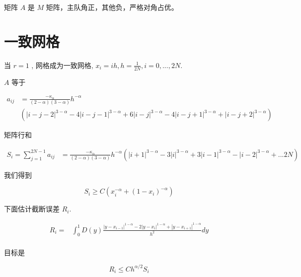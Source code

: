\documentclass{ctexart}
\theoremstyle{definition}
\theoremstyle{remark}
\numberwithin{equation}{section}
\begin{document}
矩阵 \(A\) 是 \(M\) 矩阵，主队角正，其他负，严格对角占优。


\section{一致网格}

当 \(r=1\) , 网格成为一致网格, \(x_i = ih, h=\frac{1}{2N}, i=0, ..., 2N\).

\(A\) 等于

\begin{equation}
    \begin{aligned}
        a_{ij} & = \frac{-\kappa_\alpha}{(2-\alpha)(3-\alpha)} h^{-\alpha}                                                                             \\
               & \left( |i-j-2|^{3-\alpha} - 4 |i-j-1|^{3-\alpha} + 6 |i-j|^{3-\alpha} - 4 |i-j+1|^{3-\alpha} +  |i-j+2|^{3-\alpha} \right)
    \end{aligned}
\end{equation}

矩阵行和

\begin{equation}
    \begin{aligned}
        S_i = \sum_{j=1}^{2N-1} a_{ij} & = \frac{-\kappa_\alpha}{(2-\alpha)(3-\alpha)} h^{-\alpha}
        ( |i+1|^{3-\alpha} - 3 |i|^{3-\alpha} + 3 |i-1|^{3-\alpha} - |i-2|^{3-\alpha}  + ... 2N )
    \end{aligned}
\end{equation}


我们得到

\begin{equation}
    S_i \ge  C (x_i^{-\alpha} + (1-x_i)^{-\alpha})
\end{equation}


下面估计截断误差 \(R_i\).

\begin{equation}
    \begin{aligned}
        R_i = & \int_0^1 D(y) \frac{ |y-x_{i-1}|^{1-\alpha} - 2|y-x_i |^{1-\alpha} + |y-x_{i+1}|^{1-\alpha} }{h^2} dy \\
    \end{aligned}
\end{equation}



目标是

\begin{equation}
    R_i \le C h^{\alpha/2} S_i
\end{equation}
\end{document}
